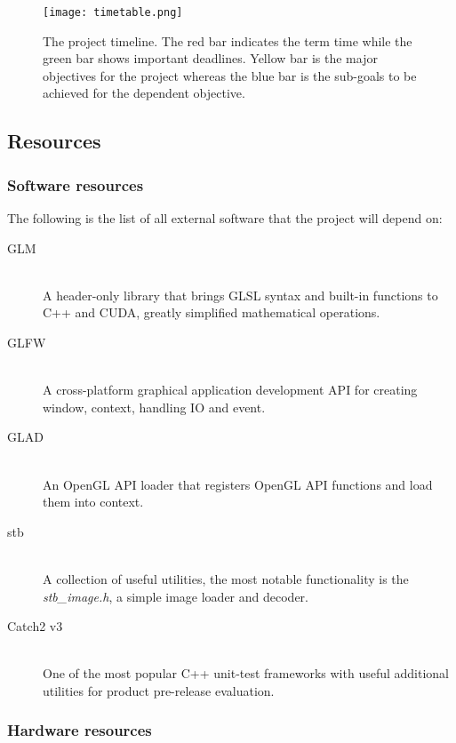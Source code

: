 \documentclass[oneside, a4paper]{article}
\begin{document}
    \begin{figure}[H]
        \texttt{[image: timetable.png]}
        \caption{The project timeline. The red bar indicates the term time while the green bar shows important deadlines. Yellow bar is the major objectives for the project whereas the blue bar is the sub-goals to be achieved for the dependent objective.}
    \end{figure}

    \subsection{Resources}

    \subsubsection{Software resources}

    The following is the list of all external software that the project will depend on:
    \begin{description}
        \item[GLM \cite{glm}] \hfill \\
            A header-only library that brings GLSL syntax and built-in functions to C++ and CUDA, greatly simplified mathematical operations.
        \item[GLFW \cite{glfw}] \hfill \\
            A cross-platform graphical application development API for creating window, context, handling IO and event.
        \item[GLAD \cite{glad}] \hfill \\
            An OpenGL API loader that registers OpenGL API functions and load them into context.
        \item[stb \cite{stb}] \hfill \\
            A collection of useful utilities, the most notable functionality is the \textit{stb\_image.h}, a simple image loader and decoder.
        \item[Catch2 v3 \cite{catch2}] \hfill \\
            One of the most popular C++ unit-test frameworks with useful additional utilities for product pre-release evaluation.
    \end{description}

    \subsubsection{Hardware resources}
\end{document}
